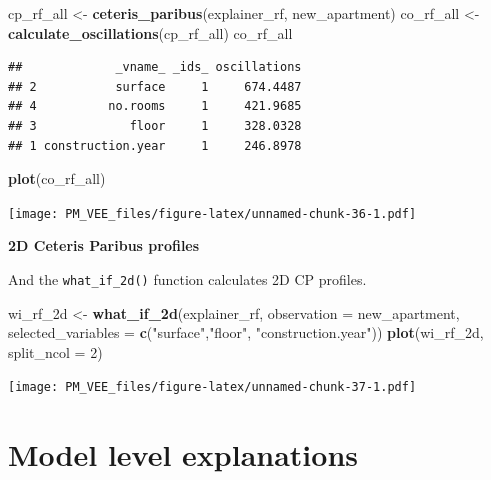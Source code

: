 \documentclass[]{book}
\newenvironment{Shaded}{\begin{snugshade}}{\end{snugshade}}
\newcommand{\DataTypeTok}[1]{\textcolor[rgb]{0.13,0.29,0.53}{#1}}
\newcommand{\DecValTok}[1]{\textcolor[rgb]{0.00,0.00,0.81}{#1}}
\newcommand{\KeywordTok}[1]{\textcolor[rgb]{0.13,0.29,0.53}{\textbf{#1}}}
\newcommand{\NormalTok}[1]{#1}
\newcommand{\StringTok}[1]{\textcolor[rgb]{0.31,0.60,0.02}{#1}}
\theoremstyle{definition}
\theoremstyle{definition}
\theoremstyle{definition}
\theoremstyle{remark}
\begin{document}
\begin{Shaded}
\begin{Highlighting}[]
\NormalTok{cp_rf_all <-}\StringTok{ }\KeywordTok{ceteris_paribus}\NormalTok{(explainer_rf, new_apartment)}
\NormalTok{co_rf_all <-}\StringTok{ }\KeywordTok{calculate_oscillations}\NormalTok{(cp_rf_all)}
\NormalTok{co_rf_all}
\end{Highlighting}
\end{Shaded}

\begin{verbatim}
##             _vname_ _ids_ oscillations
## 2           surface     1     674.4487
## 4          no.rooms     1     421.9685
## 3             floor     1     328.0328
## 1 construction.year     1     246.8978
\end{verbatim}

\begin{Shaded}
\begin{Highlighting}[]
\KeywordTok{plot}\NormalTok{(co_rf_all)}
\end{Highlighting}
\end{Shaded}

\texttt{[image: PM\_VEE\_files/figure-latex/unnamed-chunk-36-1.pdf]}

\textbf{2D Ceteris Paribus profiles}

And the \texttt{what\_if\_2d()} function calculates 2D CP profiles.

\begin{Shaded}
\begin{Highlighting}[]
\NormalTok{wi_rf_2d <-}\StringTok{ }\KeywordTok{what_if_2d}\NormalTok{(explainer_rf, }\DataTypeTok{observation =}\NormalTok{ new_apartment, }
                 \DataTypeTok{selected_variables =} \KeywordTok{c}\NormalTok{(}\StringTok{"surface"}\NormalTok{,}\StringTok{"floor"}\NormalTok{, }\StringTok{"construction.year"}\NormalTok{))}
\KeywordTok{plot}\NormalTok{(wi_rf_2d, }\DataTypeTok{split_ncol =} \DecValTok{2}\NormalTok{)}
\end{Highlighting}
\end{Shaded}

\texttt{[image: PM\_VEE\_files/figure-latex/unnamed-chunk-37-1.pdf]}

\hypertarget{model-level-explanations}{%
\chapter*{Model level explanations}\label{model-level-explanations}}
\end{document}

